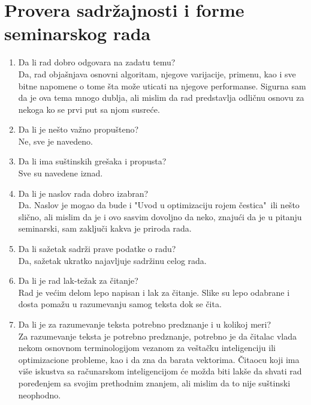 \documentclass[a4paper]{report}
\begin{document}
\section{Provera sadržajnosti i forme seminarskog rada}

\begin{enumerate}
\item Da li rad dobro odgovara na zadatu temu?\\
Da, rad objašnjava osnovni algoritam, njegove varijacije, primenu, kao i sve bitne napomene o tome šta može uticati na njegove performanse. Sigurna sam da je ova tema mnogo dublja, ali mislim da rad predstavlja odličnu osnovu za nekoga ko se prvi put sa njom susreće.

\item Da li je nešto važno propušteno?\\
Ne, sve je navedeno.

\item Da li ima suštinskih grešaka i propusta?\\
Sve su navedene iznad.

\item Da li je naslov rada dobro izabran?\\
Da. Naslov je mogao da bude i "Uvod u optimizaciju rojem čestica"\ ili nešto slično, ali mislim da je i ovo sasvim dovoljno da neko, znajući da je u pitanju seminarski, sam zaključi kakva je priroda rada.

\item Da li sažetak sadrži prave podatke o radu?\\
Da, sažetak ukratko najavljuje sadržinu celog rada.

\item Da li je rad lak-težak za čitanje?\\
Rad je većim delom lepo napisan i lak za čitanje. Slike su lepo odabrane i dosta pomažu u razumevanju samog teksta dok se čita.

\item Da li je za razumevanje teksta potrebno predznanje i u kolikoj meri?\\
Za razumevanje teksta je potrebno predznanje, potrebno je da čitalac vlada nekom osnovnom terminologijom vezanom za veštačku inteligenciju ili optimizacione probleme, kao i da zna da barata vektorima. Čitaocu koji ima više iskustva sa računarskom inteligencijom će možda biti lakše da shvati rad poređenjem sa svojim prethodnim znanjem, ali mislim da to nije suštinski neophodno.


\end{enumerate}
\end{document}

